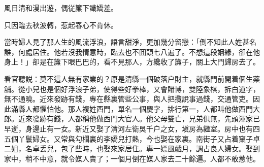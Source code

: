 \begin{myquote}
風日清和漫出遊，偶従簾下識嬌羞。

只因臨去秋波轉，惹起春心不肯休。
\end{myquote}

當時婦人見了那人生的風流浮浪，語言甜淨，更加幾分留戀：「倒不知此人姓甚名誰，何處居住。他若沒我情意時，臨去也不囬頭七八遍了。不想這段姻緣，卻在他身上！」卻是在簾下眼巴巴的，看不見那人，方纔收了簾子，關上大門歸房去了。

看官聽説：莫不這人無有家業的？原是清縣一個破落户財主，就縣門前開着個生薬舖。從小兒也是個好浮浪子弟，使得些好拳棒，又會賭博，雙陸象棋，拆白道字，無不通曉。近來發跡有錢，專在縣裏管些公事，與人把攬說事過錢，交通管吏。因此滿縣人都懼怕他。那人複姓西門，單名一個慶字，排行第一，人都叫他做西門大郎。近來發跡有錢，人都稱他做西門大官人。他父母雙亡，兄弟俱無，先頭渾家已早逝，身邊止有一女。新近又娶了清河左衛吳千户之女，塡房為繼室。房中也有四五個丫鬟婦女。又常與勾欄裏的李嬌兒打熱，今也娶在家裏。南街子又占着窠子卓二姐，名卓丢兒，包了些時，也娶來家居住。專一嫖風戲月，調占良人婦女。娶到家中，稍不中意，就令媒人賣了；一個月倒在媒人家去二十餘遍。人都不敢惹他。

